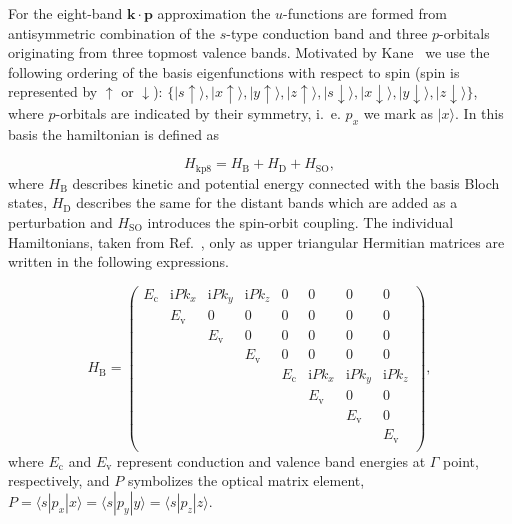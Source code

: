 For the eight-band $\mathbf{k\cdot p}$ approximation the $u$-functions are formed from antisymmetric combination of the $s$-type conduction band and three $p$-orbitals originating from three topmost valence bands. Motivated by Kane~\citep{Kane} we use the following ordering of the basis eigenfunctions with respect to spin (spin is represented by $\uparrow$ or $\downarrow$): $\{|s\uparrow\rangle, |x\uparrow\rangle, |y\uparrow\rangle, |z\uparrow\rangle, |s\downarrow\rangle, |x\downarrow\rangle, |y\downarrow\rangle, |z\downarrow\rangle\}$, where $p$-orbitals are indicated by their symmetry, i.~e. $p_x$ we mark as $|x\rangle$. In this basis the hamiltonian is defined as 

\begin{equation}
H_{\mathrm{kp8}}=H_\mathrm{B}+H_\mathrm{D}+H_\mathrm{SO},\label{eq:ham8kp}%
\end{equation}
where $H_{\mathrm{B}}$ describes kinetic and potential energy connected with the basis Bloch states, $H_{\mathrm{D}}$ describes the same for the distant bands which are added as a perturbation and $H_{\mathrm{SO}}$ introduces the spin-orbit coupling. The individual Hamiltonians, taken from Ref.~\citep{t_stier}, only as upper triangular Hermitian matrices are written in the following expressions.

\begin{equation}
H_\mathrm{B}=
\begin{pmatrix}
E_\mathrm{c}& \mathrm{i}Pk_x& \mathrm{i}Pk_y& \mathrm{i}Pk_z& 0& 0& 0& 0\\
& E_\mathrm{v}& 0& 0& 0& 0& 0& 0\\
& & E_\mathrm{v}& 0& 0& 0& 0& 0\\
& & & E_\mathrm{v}& 0& 0& 0& 0\\
& & & & E_\mathrm{c}& \mathrm{i}Pk_x& \mathrm{i}Pk_y& \mathrm{i}Pk_z\\
& & & & & E_\mathrm{v}& 0& 0\\
& & & & & & E_\mathrm{v}& 0\\
& & & & & & & E_\mathrm{v}\\
\end{pmatrix},
\end{equation}
where $E_\mathrm{c}$ and $E_\mathrm{v}$ represent conduction and valence band energies at $\Gamma$ point, respectively, and $P$ symbolizes the optical matrix element, $P=\langle s|p_x|x\rangle=\langle s|p_y|y\rangle=\langle s|p_z|z\rangle$.

